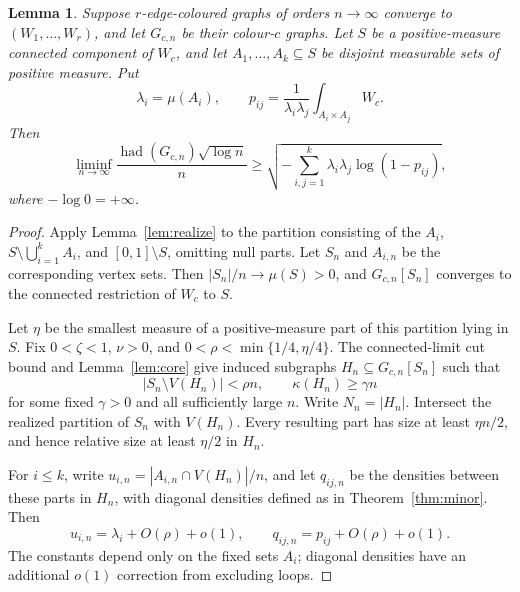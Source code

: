 \documentclass[11pt]{article}
\newtheorem{lemma}[theorem]{Lemma}
\newcommand{\had}{\operatorname{had}}
\begin{document}
\begin{lemma}\label{lem:lift}
Suppose $r$-edge-coloured graphs of orders $n\to\infty$ converge to
$(W_1,\ldots,W_r)$, and let $G_{c,n}$ be their colour-$c$ graphs.
Let $S$ be a positive-measure connected component of $W_c$, and let
$A_1,\ldots,A_k\subseteq S$ be disjoint measurable sets of positive measure.
Put
\[
 \lambda_i=\mu(A_i),\qquad
 p_{ij}=\frac{1}{\lambda_i \lambda_j}\int_{A_i\times A_j}W_c.
\]
Then
\begin{equation}\label{eq:lift}
 \liminf_{n\to\infty}\frac{\had(G_{c,n})\sqrt{\log n}}{n}
 \geq\sqrt{-\sum_{i,j=1}^k \lambda_i \lambda_j\log(1-p_{ij})},
\end{equation}
where $-\log0=+\infty$.
\end{lemma}
\begin{proof}
Apply Lemma~\ref{lem:realize} to the partition consisting of the $A_i$,
$S\setminus\bigcup_{i=1}^k A_i$, and $[0,1]\setminus S$, omitting null parts.
Let $S_n$ and $A_{i,n}$ be the corresponding vertex sets. Then
$|S_n|/n\to\mu(S)>0$, and $G_{c,n}[S_n]$ converges to the connected
restriction of $W_c$ to $S$.

Let $\eta$ be the smallest measure of a positive-measure part of this
partition lying in $S$. Fix $0<\zeta<1$, $\nu>0$, and
$0<\rho<\min\{1/4,\eta/4\}$. The connected-limit cut bound and
Lemma~\ref{lem:core} give induced subgraphs $H_n\subseteq G_{c,n}[S_n]$
such that
\[
 |S_n\setminus V(H_n)|<\rho n,\qquad
 \kappa(H_n)\geq\gamma n
\]
for some fixed $\gamma>0$ and all sufficiently large $n$.
Write $N_n=|H_n|$. Intersect the realized partition of $S_n$ with $V(H_n)$.
Every resulting part has size at least $\eta n/2$, and hence relative size
at least $\eta/2$ in $H_n$.

For $i\leq k$, write $u_{i,n}=|A_{i,n}\cap V(H_n)|/n$, and let $q_{ij,n}$
be the densities between these parts in $H_n$, with diagonal densities
defined as in Theorem~\ref{thm:minor}. Then
\[
 u_{i,n}=\lambda_i+O(\rho)+o(1),\qquad
 q_{ij,n}=p_{ij}+O(\rho)+o(1).
\]
The constants depend only on the fixed sets $A_i$; diagonal densities
have an additional $o(1)$ correction from excluding loops.


\end{proof}
\end{document}

